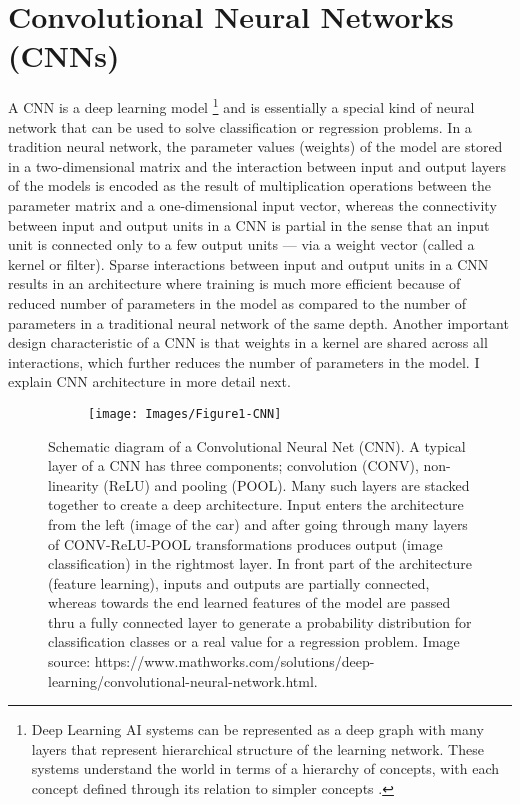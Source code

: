 \documentclass [11pt,letterpaper ,twoside ,openany ]{report}
\begin{document}
     \section{Convolutional Neural Networks (CNNs)}
     A CNN is a deep learning model \footnote {Deep Learning AI systems can be represented as a deep graph with many layers that represent hierarchical structure of the learning network. These systems understand the world in terms of a hierarchy of concepts, with each concept defined through its relation to simpler concepts \cite{Goodfellow-et-al-2016}.} and is essentially a special kind of neural network that can be used to solve classification or regression problems. In a tradition neural network, the parameter values (weights) of the model are stored in a two-dimensional matrix and the interaction between input and output layers of the models is encoded as the result of multiplication operations between the parameter matrix and a one-dimensional input vector, whereas the connectivity between input and output units in a CNN is partial in the sense that an input unit is connected only to a few output units --- via a weight vector (called a kernel or filter). Sparse interactions between input and output units in a CNN results in an architecture where training is much more efficient because of reduced number of parameters in the model as compared to the number of parameters in a traditional neural network of the same depth. Another important design characteristic of a CNN is that weights in a kernel are shared across all interactions, which further reduces the number of parameters in the model. I explain CNN architecture in more detail next. 

    \begin{figure}[t!]
      \centering
      \begin{subfigure}[b]{0.98\linewidth}
        \texttt{[image: Images/Figure1-CNN]}
      \end{subfigure}
      \caption{Schematic diagram of a Convolutional Neural Net (CNN). A typical layer of a CNN has three components; convolution (CONV), non-linearity (ReLU) and pooling (POOL). Many such layers are stacked together to create a deep architecture. Input enters the architecture from the left (image of the car) and after going through many layers of CONV-ReLU-POOL transformations produces output (image classification) in the rightmost layer. In front part of the architecture (feature learning), inputs and outputs are partially connected, whereas towards the end learned features of the model are passed thru a fully connected layer to generate a probability distribution for classification classes or a real value for a regression problem. Image source: https://www.mathworks.com/solutions/deep-learning/convolutional-neural-network.html.}
      \label{fig:cnn}
    \end{figure}
\end{document}
